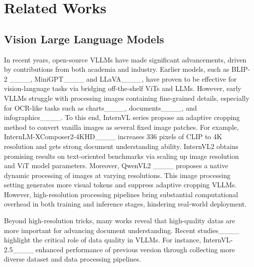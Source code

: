 \section{Related Works}
\subsection{Vision Large Language Models}



In recent years, open-source  VLLMs have made significant advancements, driven by contributions from both academia and industry. 
Earlier models, such as BLIP-2 ____, MiniGPT____ and LLaVA____, have proven to be effective for vision-language tasks via bridging off-the-shelf ViTs and LLMs. 
However, early VLLMs struggle with processing images containing
fine-grained details, especially for OCR-like tasks such as charts____, documents____,
and infographics____. To this end, InternVL series propose
an adaptive cropping method to convert vanilla images as several fixed image patches. For example, InternLM-XComposer2-4KHD____ increases 336 pixels of CLIP to 4K resolution and gets strong document understanding ability. InternVL2
obtains promising results on text-oriented benchmarks via scaling up image resolution and ViT model parameters. Moreover, QwenVL2 ____ proposes a native dynamic processing of images at varying resolutions. This image processing setting generates more visual tokens and suppress adaptive cropping VLLMs. However,
high-resolution processing pipelines bring substantial computational overhead in both training and inference stages, hindering real-world deployment.






Beyond high-resolution tricks, many works reveal that high-quality datas are more important for advancing document understanding. Recent studies____ highlight the critical role of data quality in VLLMs. For instance, InternVL-2.5____ enhanced performance of previous version through collecting more diverse dataset and data processing pipelines.

